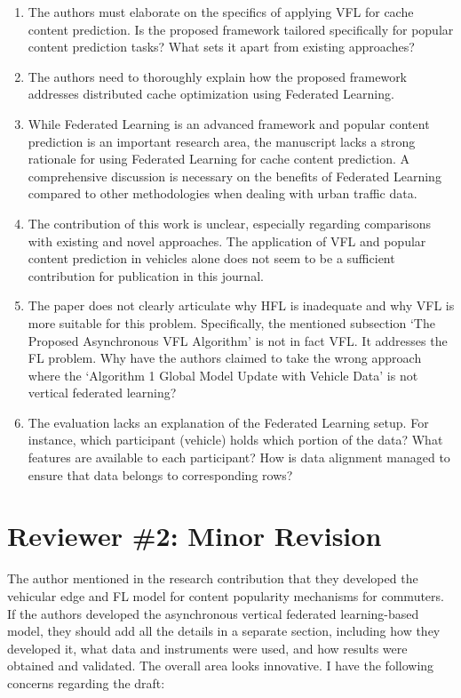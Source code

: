 \documentclass[a4paper,12pt]{article}
\begin{document}
\begin{enumerate}
    \item The authors must elaborate on the specifics of applying VFL for cache content prediction. Is the proposed framework tailored specifically for popular content prediction tasks? What sets it apart from existing approaches?
    \item The authors need to thoroughly explain how the proposed framework addresses distributed cache optimization using Federated Learning.
    \item While Federated Learning is an advanced framework and popular content prediction is an important research area, the manuscript lacks a strong rationale for using Federated Learning for cache content prediction. A comprehensive discussion is necessary on the benefits of Federated Learning compared to other methodologies when dealing with urban traffic data.
    \item The contribution of this work is unclear, especially regarding comparisons with existing and novel approaches. The application of VFL and popular content prediction in vehicles alone does not seem to be a sufficient contribution for publication in this journal.
    \item The paper does not clearly articulate why HFL is inadequate and why VFL is more suitable for this problem. Specifically, the mentioned subsection `The Proposed Asynchronous VFL Algorithm’ is not in fact VFL. It addresses the FL problem. Why have the authors claimed to take the wrong approach where the `Algorithm 1 Global Model Update with Vehicle Data’ is not vertical federated learning?
    \item The evaluation lacks an explanation of the Federated Learning setup. For instance, which participant (vehicle) holds which portion of the data? What features are available to each participant? How is data alignment managed to ensure that data belongs to corresponding rows?
\end{enumerate}

\section*{Reviewer \#2: Minor Revision}

The author mentioned in the research contribution that they developed the vehicular edge and FL model for content popularity mechanisms for commuters. If the authors developed the asynchronous vertical federated learning-based model, they should add all the details in a separate section, including how they developed it, what data and instruments were used, and how results were obtained and validated. The overall area looks innovative. I have the following concerns regarding the draft:
\end{document}
